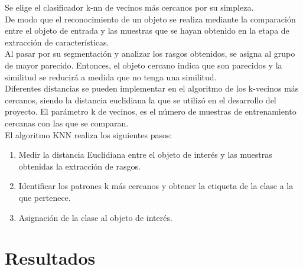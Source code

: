 \documentclass[a4paper, 11pt]{article}
\begin{document}
Se elige el clasificador k-nn de vecinos más cercanos por su simpleza.\\

De modo que el reconocimiento de un objeto se realiza mediante la comparación entre el objeto de entrada y las muestras que se hayan obtenido en la etapa de extracción de características.\\
Al pasar por su segmentación y analizar los rasgos obtenidos, se asigna al grupo de mayor parecido. Entonces, el objeto cercano indica que son parecidos y la similitud se reducirá a medida que no tenga una similitud.\\

Diferentes distancias se pueden implementar en el algoritmo de los k-vecinos más cercanos, siendo la distancia euclidiana la que se utilizó en el desarrollo del proyecto. El parámetro k de vecinos, es el número de muestras de entrenamiento cercanas con las que se comparan.\\

El algoritmo KNN realiza los siguientes pasos:

\begin{enumerate}
\item Medir la distancia Euclidiana entre el objeto de interés y las muestras obtenidas la extracción de rasgos.
\item Identificar los patrones k más cercanos y obtener la etiqueta de la clase a la que pertenece.
\item Asignación de la clase al objeto de interés.
\end{enumerate}

\newpage
\section{Resultados}
\end{document}

